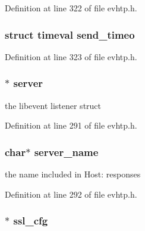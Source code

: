 Definition at line 322 of file evhtp.\-h.

\hypertarget{structevhtp__s_a7ffa291d73974047489f8880e5363603}{
\subsubsection[{send\-\_\-timeo}]{\setlength{\rightskip}{0pt plus 5cm}struct timeval send\-\_\-timeo}}\label{structevhtp__s_a7ffa291d73974047489f8880e5363603}


Definition at line 323 of file evhtp.\-h.

\hypertarget{structevhtp__s_adbf9415567b9a26229148539d64a5eda}{
\subsubsection[{server}]{$\ast$ server}}\label{structevhtp__s_adbf9415567b9a26229148539d64a5eda}
the libevent listener struct 

Definition at line 291 of file evhtp.\-h.

\hypertarget{structevhtp__s_a4e06dd572147d48785afd0439576487a}{
\subsubsection[{server\-\_\-name}]{\setlength{\rightskip}{0pt plus 5cm}char$\ast$ server\-\_\-name}}\label{structevhtp__s_a4e06dd572147d48785afd0439576487a}
the name included in Host\-: responses 

Definition at line 292 of file evhtp.\-h.

\hypertarget{structevhtp__s_afb6cdde78523e94fa84f57e55280513f}{
\subsubsection[{ssl\-\_\-cfg}]{$\ast$ ssl\-\_\-cfg}}\label{structevhtp__s_afb6cdde78523e94fa84f57e55280513f}


